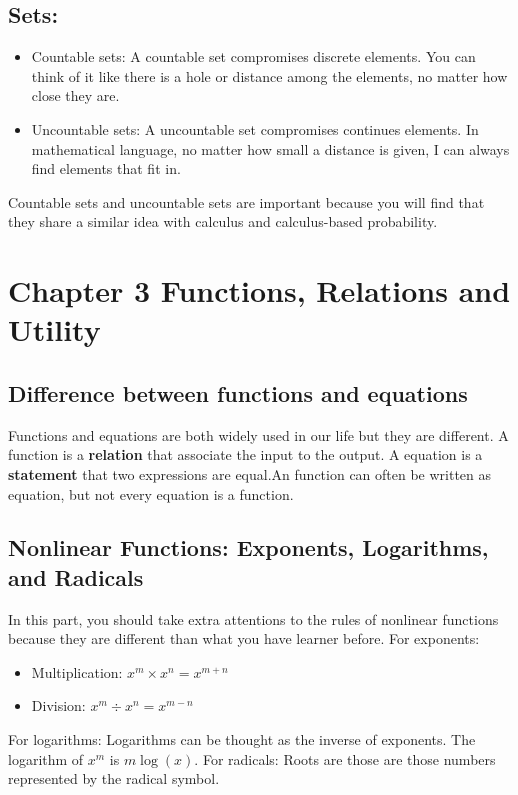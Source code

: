 \documentclass{article}
\begin{document}
\subsection{Sets:}
\begin{itemize}
    \item Countable sets: A countable set compromises discrete elements. You can think of it like there is a hole or distance among the elements, no matter how close they are. 
    \item Uncountable sets: A uncountable set compromises continues elements. In mathematical language, no matter how small a distance is given, I can always find elements that fit in.
\end{itemize}
Countable sets and uncountable sets are important because you will find that they share a similar idea with calculus and calculus-based probability. 

\section{Chapter 3 Functions, Relations and Utility}
\subsection{Difference between functions and equations}
Functions and equations are both widely used in our life but they are different. A function is a \textbf{relation} that associate the input to the output. A equation is a \textbf{statement} that two expressions are equal.An function can often be written as equation, but not every equation is a function. 

\subsection{Nonlinear Functions: Exponents, Logarithms, and Radicals}
In this part, you should take extra attentions to the rules of nonlinear functions because they are different than what you have learner before. \newline For exponents:
\begin{itemize}
    \item Multiplication: \(x^m \times x^n = x^{m+n} \) 
    \item Division: \(x^m \div x^n = x^{m-n} \)
\end{itemize}

\newline For logarithms:
Logarithms can be thought as the inverse of exponents. The logarithm of \(x^m\) is \(m\log(x)\).
\newline For radicals:
Roots are those are those numbers represented by the radical symbol.
\end{document}
